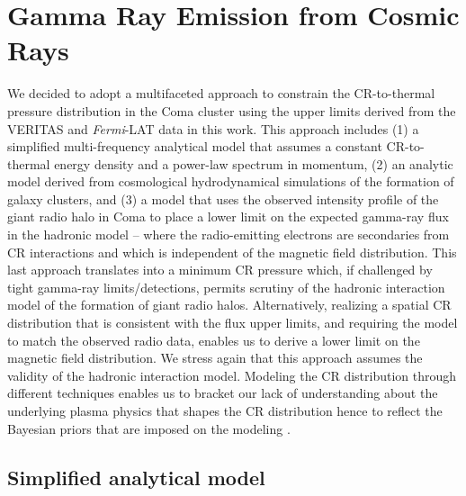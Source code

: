 \documentclass[12pt,manuscript]{aastex}
\def\Fermi{{\em Fermi}\xspace}
\begin{document}
\section{Gamma Ray Emission from Cosmic Rays}
We decided to adopt a multifaceted approach to constrain the CR-to-thermal pressure distribution in
the Coma cluster using the upper limits derived from the VERITAS and \Fermi-LAT data in this work.
This approach includes (1) a simplified multi-frequency analytical model that assumes a constant
CR-to-thermal energy density and a power-law spectrum in momentum, (2) an analytic model derived
from cosmological hydrodynamical simulations of the formation of galaxy clusters, and (3) a
model that uses the observed intensity profile
of the giant radio halo in Coma to place a lower limit on
the expected gamma-ray flux in the hadronic model -- where the radio-emitting electrons are
secondaries from CR interactions and which is independent of the magnetic field distribution.  This
last approach translates into a minimum CR pressure which, if challenged by tight gamma-ray
limits/detections, permits scrutiny of the hadronic interaction model of the formation of giant
radio halos. Alternatively, realizing a spatial CR distribution that is consistent with the flux
upper limits, and requiring the model to match the observed radio data, enables us to derive a
lower limit on the magnetic field distribution. We stress again that this approach assumes the
validity of the hadronic interaction model. Modeling the CR distribution through different
techniques enables us to bracket our lack of understanding about the underlying plasma physics that
shapes the CR distribution hence to reflect the Bayesian priors that are imposed on the modeling
\citep[see][for a discussion]{article:PinzkePfrommerBergstrom}.

%
%

\subsection{Simplified analytical model}
\label{sec:simple}
\end{document}
